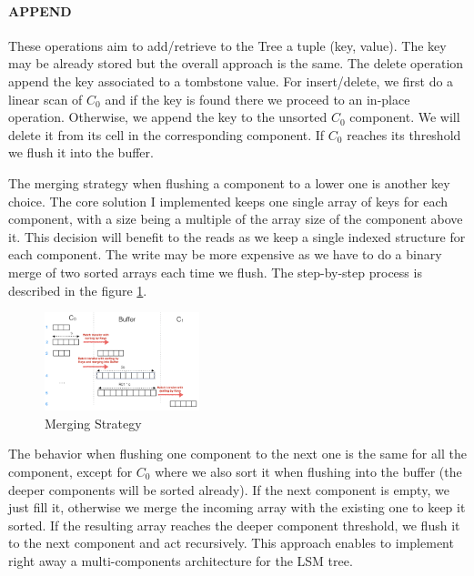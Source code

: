 \documentclass{sig-alternate-05-2015}
\begin{document}
\paragraph{APPEND}
These operations aim to add/retrieve to the Tree a tuple (key, value). The key may be already stored but the overall approach is the same. The delete operation append the key associated to a tombstone value. For insert/delete, we first do a linear scan of $C_0$ and if the key is found there we proceed to an in-place operation. Otherwise, we append the key to the unsorted $C_0$ component. We will delete it from its cell in the corresponding component. If $C_0$ reaches its threshold we flush it into the buffer.

The merging strategy when flushing a component to a lower one is another key choice. The core solution I implemented keeps one single array of keys for each component, with a size being a multiple of the array size of the component above it. This decision will benefit to the reads as we keep a single indexed structure for each component. The write may be more expensive as we have to do a binary merge of two sorted arrays each time we flush. The step-by-step process is described in the figure \ref{fig:merge}.

\begin{figure}[H]
\begin{center}
    \includegraphics[width=0.4\textwidth]{merge}
    \caption{Merging Strategy}
    \label{fig:merge}
\end{center}
\end{figure}

The behavior when flushing one component to the next one is the same for all the component, except for $C_0$ where we also sort it when flushing into the buffer (the deeper components will be sorted already). If the next component is empty, we just fill it, otherwise we merge the incoming array with the existing one to keep it sorted. If the resulting array reaches the deeper component threshold, we flush it to the next component and act recursively. This approach enables to implement right away a multi-components architecture for the LSM tree.
\end{document}
